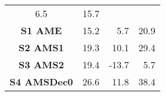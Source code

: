 \begin{longtable}[]{@{}crrr@{}}
\begin{minipage}[t]{0.30\columnwidth}
6.5\strut
\end{minipage} & \begin{minipage}[t]{0.09\columnwidth}\raggedleft\strut
15.7\strut
\end{minipage}\tabularnewline
\begin{minipage}[t]{0.21\columnwidth}\centering\strut
\textbf{S1 AME}\strut
\end{minipage} & \begin{minipage}[t]{0.17\columnwidth}\raggedleft\strut
15.2\strut
\end{minipage} & \begin{minipage}[t]{0.30\columnwidth}\raggedleft\strut
5.7\strut
\end{minipage} & \begin{minipage}[t]{0.09\columnwidth}\raggedleft\strut
20.9\strut
\end{minipage}\tabularnewline
\begin{minipage}[t]{0.21\columnwidth}\centering\strut
\textbf{S2 AMS1}\strut
\end{minipage} & \begin{minipage}[t]{0.17\columnwidth}\raggedleft\strut
19.3\strut
\end{minipage} & \begin{minipage}[t]{0.30\columnwidth}\raggedleft\strut
10.1\strut
\end{minipage} & \begin{minipage}[t]{0.09\columnwidth}\raggedleft\strut
29.4\strut
\end{minipage}\tabularnewline
\begin{minipage}[t]{0.21\columnwidth}\centering\strut
\textbf{S3 AMS2}\strut
\end{minipage} & \begin{minipage}[t]{0.17\columnwidth}\raggedleft\strut
19.4\strut
\end{minipage} & \begin{minipage}[t]{0.30\columnwidth}\raggedleft\strut
-13.7\strut
\end{minipage} & \begin{minipage}[t]{0.09\columnwidth}\raggedleft\strut
5.7\strut
\end{minipage}\tabularnewline
\begin{minipage}[t]{0.21\columnwidth}\centering\strut
\textbf{S4 AMSDec0}\strut
\end{minipage} & \begin{minipage}[t]{0.17\columnwidth}\raggedleft\strut
26.6\strut
\end{minipage} & \begin{minipage}[t]{0.30\columnwidth}\raggedleft\strut
11.8\strut
\end{minipage} & \begin{minipage}[t]{0.09\columnwidth}\raggedleft\strut
38.4\strut
\end{minipage}\tabularnewline
\bottomrule
\end{longtable}
